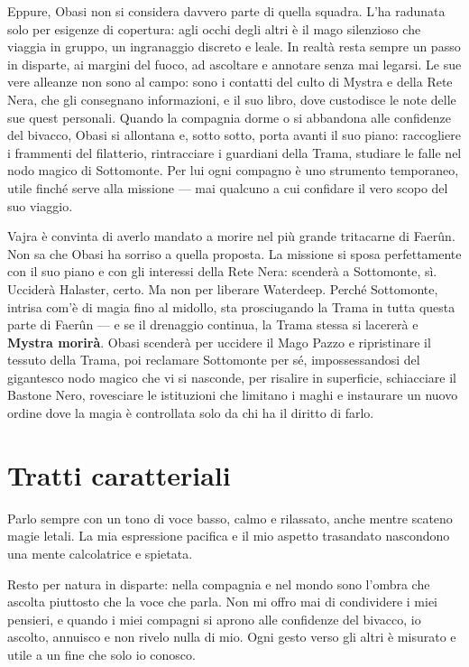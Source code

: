 \documentclass[letterpaper,twocolumn,openany,nodeprecatedcode,justified]{dndbook}
\begin{document}
Eppure, Obasi non si considera davvero parte di quella squadra. L'ha
radunata solo per esigenze di copertura: agli occhi degli altri è il mago
silenzioso che viaggia in gruppo, un ingranaggio discreto e leale. In
realtà resta sempre un passo in disparte, ai margini del fuoco, ad
ascoltare e annotare senza mai legarsi. Le sue vere alleanze non sono al
campo: sono i contatti del culto di Mystra e della Rete Nera, che gli
consegnano informazioni, e il suo libro, dove custodisce le note delle sue
quest personali. Quando la compagnia dorme o si abbandona alle confidenze
del bivacco, Obasi si allontana e, sotto sotto, porta avanti il suo piano:
raccogliere i frammenti del filatterio, rintracciare i guardiani della
Trama, studiare le falle nel nodo magico di Sottomonte. Per lui ogni
compagno è uno strumento temporaneo, utile finché serve alla missione ---
mai qualcuno a cui confidare il vero scopo del suo viaggio.

Vajra è convinta di averlo mandato a morire nel più grande tritacarne di
Faerûn. Non sa che Obasi ha sorriso a quella proposta. La missione si
sposa perfettamente con il suo piano e con gli interessi della Rete Nera:
scenderà a Sottomonte, sì. Ucciderà Halaster, certo. Ma non per liberare
Waterdeep. Perché Sottomonte, intrisa com'è di magia fino al midollo, sta
prosciugando la Trama in tutta questa parte di Faerûn --- e se il drenaggio
continua, la Trama stessa si lacererà e \textbf{Mystra morirà}. Obasi
scenderà per uccidere il Mago Pazzo e ripristinare il tessuto della Trama,
poi reclamare Sottomonte per sé, impossessandosi del gigantesco nodo
magico che vi si nasconde, per risalire in superficie, schiacciare il
Bastone Nero, rovesciare le istituzioni che limitano i maghi e instaurare
un nuovo ordine dove la magia è controllata solo da chi ha il diritto di
farlo.

\section{Tratti caratteriali}
Parlo sempre con un tono di voce basso, calmo e rilassato, anche mentre
scateno magie letali. La mia espressione pacifica e il mio aspetto
trasandato nascondono una mente calcolatrice e spietata.

Resto per natura in disparte: nella compagnia e nel mondo sono l'ombra
che ascolta piuttosto che la voce che parla. Non mi offro mai di
condividere i miei pensieri, e quando i miei compagni si aprono alle
confidenze del bivacco, io ascolto, annuisco e non rivelo nulla di mio.
Ogni gesto verso gli altri è misurato e utile a un fine che solo io
conosco.
\end{document}
